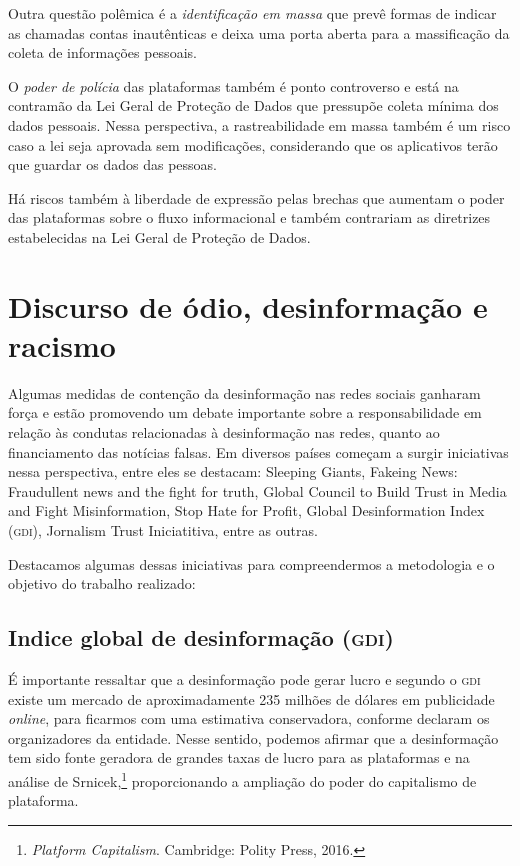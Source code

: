 Outra questão polêmica é a \textit{identificação em massa} que prevê formas de indicar as chamadas contas inautênticas e deixa uma porta aberta para a massificação da coleta de informações pessoais.

O \textit{poder de polícia} das plataformas também é ponto controverso e está na contramão da Lei Geral de Proteção de Dados que pressupõe coleta mínima dos dados pessoais. Nessa perspectiva, a rastreabilidade em massa também é um risco caso a lei seja aprovada sem modificações, considerando que os aplicativos terão que guardar os dados das pessoas.

Há riscos também à liberdade de expressão pelas brechas que aumentam o poder das plataformas sobre o fluxo informacional e também contrariam as diretrizes estabelecidas na Lei Geral de Proteção de Dados.

\section{Discurso de ódio, desinformação e racismo}

Algumas medidas de contenção da desinformação nas redes sociais ganharam
força e estão promovendo um debate importante sobre a responsabilidade
em relação às condutas relacionadas à desinformação nas redes, quanto ao
financiamento das notícias falsas. Em diversos países começam a surgir
iniciativas nessa perspectiva, entre eles se destacam: Sleeping Giants,
Fakeing News: Fraudullent news and the fight for truth, Global Council
to Build Trust in Media and Fight Misinformation, Stop Hate for Profit, Global Desinformation Index (\textsc{gdi}), Jornalism Trust Iniciatitiva, entre
as outras.

Destacamos algumas dessas iniciativas para compreendermos a metodologia
e o objetivo do trabalho realizado:

\subsection{Indice global de desinformação (\textsc{gdi})}

É importante ressaltar que a desinformação pode gerar lucro e segundo o
\textsc{gdi} existe um mercado de
aproximadamente 235 milhões de dólares em publicidade \textit{online}, para ficarmos
com uma estimativa conservadora, conforme declaram os organizadores da
entidade. Nesse sentido, podemos afirmar que a desinformação tem sido
fonte geradora de grandes taxas de lucro para as plataformas e na
análise de Srnicek,\footnote{\textit{Platform Capitalism}. Cambridge: Polity Press, 2016.} proporcionando a ampliação do poder do capitalismo de plataforma.


